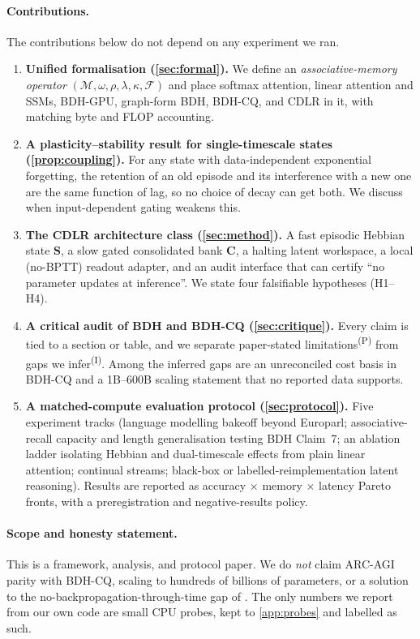 \documentclass[11pt]{article}
\theoremstyle{remark}
\newcommand{\Sm}{\mathbf{S}}
\newcommand{\Cm}{\mathbf{C}}
\newcommand{\PS}{\textsuperscript{(P)}}
\newcommand{\IN}{\textsuperscript{(I)}}
\newcommand{\cdlr}{\textsc{CDLR}}
\begin{document}
\paragraph{Contributions.} The contributions below do not depend on any experiment we ran.
\begin{enumerate}[label=\textbf{C\arabic*.},leftmargin=*,itemsep=2pt]
\item \textbf{Unified formalisation (\cref{sec:formal}).} We define an \emph{associative-memory operator}
$(\mathcal{M},\omega,\rho,\lambda,\kappa,\mathcal{F})$ and place softmax attention, linear attention and SSMs,
BDH-GPU, graph-form BDH, BDH-CQ, and \cdlr{} in it, with matching byte and FLOP accounting.
\item \textbf{A plasticity--stability result for single-timescale states (\cref{prop:coupling}).} For any state with
data-independent exponential forgetting, the retention of an old episode and its interference with a new one
are the same function of lag, so no choice of decay can get both. We discuss when input-dependent gating weakens
this.
\item \textbf{The \cdlr{} architecture class (\cref{sec:method}).} A fast episodic Hebbian state $\Sm$, a slow
gated consolidated bank $\Cm$, a halting latent workspace, a local (no-BPTT) readout adapter, and an audit
interface that can certify ``no parameter updates at inference''. We state four falsifiable hypotheses (H1--H4).
\item \textbf{A critical audit of BDH and BDH-CQ (\cref{sec:critique}).} Every claim is tied to a section or
table, and we separate paper-stated limitations\PS{} from gaps we infer\IN. Among the inferred gaps are an
unreconciled cost basis in BDH-CQ and a 1B--600B scaling statement that no reported data supports.
\item \textbf{A matched-compute evaluation protocol (\cref{sec:protocol}).} Five experiment tracks (language
modelling bakeoff beyond Europarl; associative-recall capacity and length generalisation testing BDH Claim~7; an
ablation ladder isolating Hebbian and dual-timescale effects from plain linear attention; continual streams;
black-box or labelled-reimplementation latent reasoning). Results are reported as accuracy $\times$ memory
$\times$ latency Pareto fronts, with a preregistration and negative-results policy.
\end{enumerate}

\paragraph{Scope and honesty statement.} This is a framework, analysis, and protocol paper. We do \emph{not}
claim ARC-AGI parity with BDH-CQ, scaling to hundreds of billions of parameters, or a solution to the
no-backpropagation-through-time gap of \citet[\S7.2]{kosowski2025bdh}. The only numbers we report from our own
code are small CPU probes, kept to \cref{app:probes} and labelled as such.
\end{document}
